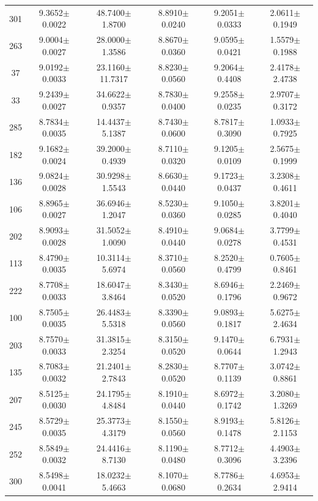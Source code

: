 \documentclass{aa}
\begin{document}
\begin{table}
\begin{center}
{{\begin{tabular}{|cccccc|}
301 & 9.3652$\pm$0.0022 & 48.7400$\pm$1.8700 & 8.8910$\pm$0.0240 & 9.2051$\pm$0.0333 & 2.0611$\pm$0.1949 \\
263 & 9.0004$\pm$0.0027 & 28.0000$\pm$1.3586 & 8.8670$\pm$0.0360 & 9.0595$\pm$0.0421 & 1.5579$\pm$0.1988 \\
37 & 9.0192$\pm$0.0033 & 23.1160$\pm$11.7317 & 8.8230$\pm$0.0560 & 9.2064$\pm$0.4408 & 2.4178$\pm$2.4738 \\
33 & 9.2439$\pm$0.0027 & 34.6622$\pm$0.9357 & 8.7830$\pm$0.0400 & 9.2558$\pm$0.0235 & 2.9707$\pm$0.3172 \\
285 & 8.7834$\pm$0.0035 & 14.4437$\pm$5.1387 & 8.7430$\pm$0.0600 & 8.7817$\pm$0.3090 & 1.0933$\pm$0.7925 \\
182 & 9.1682$\pm$0.0024 & 39.2000$\pm$0.4939 & 8.7110$\pm$0.0320 & 9.1205$\pm$0.0109 & 2.5675$\pm$0.1999 \\
136 & 9.0824$\pm$0.0028 & 30.9298$\pm$1.5543 & 8.6630$\pm$0.0440 & 9.1723$\pm$0.0437 & 3.2308$\pm$0.4611 \\
106 & 8.8965$\pm$0.0027 & 36.6946$\pm$1.2047 & 8.5230$\pm$0.0360 & 9.1050$\pm$0.0285 & 3.8201$\pm$0.4040 \\
202 & 8.9093$\pm$0.0028 & 31.5052$\pm$1.0090 & 8.4910$\pm$0.0440 & 9.0684$\pm$0.0278 & 3.7799$\pm$0.4531 \\
113 & 8.4790$\pm$0.0035 & 10.3114$\pm$5.6974 & 8.3710$\pm$0.0560 & 8.2520$\pm$0.4799 & 0.7605$\pm$0.8461 \\
222 & 8.7708$\pm$0.0033 & 18.6047$\pm$3.8464 & 8.3430$\pm$0.0520 & 8.6946$\pm$0.1796 & 2.2469$\pm$0.9672 \\
100 & 8.7505$\pm$0.0035 & 26.4483$\pm$5.5318 & 8.3390$\pm$0.0560 & 9.0893$\pm$0.1817 & 5.6275$\pm$2.4634 \\
203 & 8.7570$\pm$0.0033 & 31.3815$\pm$2.3254 & 8.3150$\pm$0.0520 & 9.1470$\pm$0.0644 & 6.7931$\pm$1.2943 \\
135 & 8.7083$\pm$0.0032 & 21.2401$\pm$2.7843 & 8.2830$\pm$0.0520 & 8.7707$\pm$0.1139 & 3.0742$\pm$0.8861 \\
207 & 8.5125$\pm$0.0030 & 24.1795$\pm$4.8484 & 8.1910$\pm$0.0440 & 8.6972$\pm$0.1742 & 3.2080$\pm$1.3269 \\
245 & 8.5729$\pm$0.0035 & 25.3773$\pm$4.3179 & 8.1550$\pm$0.0560 & 8.9193$\pm$0.1478 & 5.8126$\pm$2.1153 \\
252 & 8.5849$\pm$0.0032 & 24.4416$\pm$8.7130 & 8.1190$\pm$0.0480 & 8.7712$\pm$0.3096 & 4.4903$\pm$3.2396 \\
300 & 8.5498$\pm$0.0041 & 18.0232$\pm$5.4663 & 8.1070$\pm$0.0680 & 8.7786$\pm$0.2634 & 4.6953$\pm$2.9414 \\

\end{tabular}}}
\end{center}
\end{table}
\end{document}
